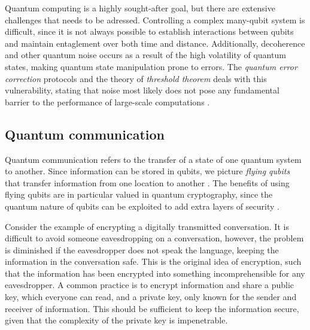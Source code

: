 
Quantum computing is a highly sought-after goal, but there are extensive challenges that needs to be adressed. Controlling a complex many-qubit system is difficult, since it is not always possible to establish interactions between qubits \cite{DiVincenzo2000} and maintain entaglement over both time and distance. Additionally, decoherence and other quantum noise occurs as a result of the high volatility of quantum states, making quantum state manipulation prone to errors. The \textit{quantum error correction} protocols and the theory of \textit{threshold theorem} deals with this vulnerability, stating that noise most likely does not pose any fundamental barrier to the performance of large-scale computations \cite{Pavicic2006}.


\subsection{Quantum communication}

Quantum communication refers to the transfer of a state of one quantum system to another. Since information can be stored in qubits, we picture \textit{flying qubits} that transfer information from one location to another \cite{Griffiths2002}. The benefits of using flying qubits are in particular valued in quantum cryptography, since the quantum nature of qubits can be exploited to add extra layers of security \cite{Pavicic2006}.



Consider the example of encrypting a digitally transmitted conversation. It is difficult to avoid someone eavesdropping on a conversation, however, the problem is diminished if the eavesdropper does not speak the language, keeping the information in the conversation safe. This is the original idea of encryption, such that the information has been encrypted into something incomprehensible for any eavesdropper. A common practice is to encrypt information and share a public key, which everyone can read, and a private key, only known for the sender and receiver of information. This should be sufficient to keep the information secure, given that the complexity of the private key is impenetrable.

